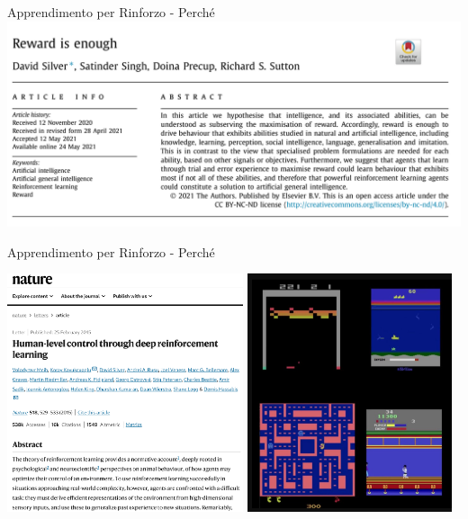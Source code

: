 \documentclass[presentation, 10pt,aspectratio=169]{beamer}\mode<presentation>{\usetheme{AMSBolognaFC}}
\begin{document}
\begin{frame}{Apprendimento per Rinforzo - Perché}
	\href{https://www.sciencedirect.com/science/article/pii/S0004370221000862}{\includegraphics[width=\textwidth]{img/reward-enough.png}}
\end{frame}

\begin{frame}{Apprendimento per Rinforzo - Perché}
	\begin{center}
	\href{https://www.nature.com/articles/nature14236}{
	\includegraphics[height=7cm]{img/nature-paper.png}}
	\href{https://www.youtube.com/watch?v=V1eYniJ0Rnk}{
	\includegraphics[height=7cm]{img/atari-dqn.png}}
	\end{center} 
\end{frame}
\end{document}
